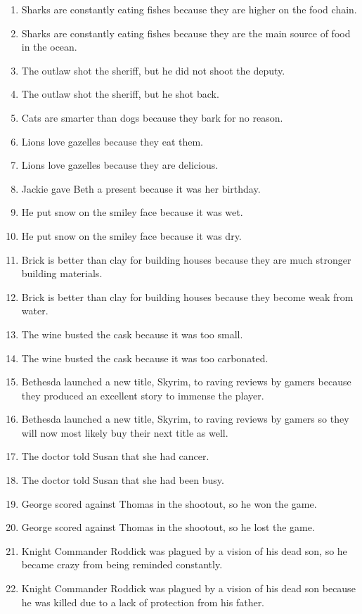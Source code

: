 \documentclass{article}
\begin{document}
\begin{enumerate}
	\item Sharks are constantly eating fishes because they are higher on the food chain.
	\item Sharks are constantly eating fishes because they are the main source of food in the ocean.
	\item The outlaw shot the sheriff, but he did not shoot the deputy.
	\item The outlaw shot the sheriff, but he shot back.
	\item Cats are smarter than dogs because they bark for no reason.
	\item Lions love gazelles because they eat them.
	\item Lions love gazelles because they are delicious.
	\item Jackie gave Beth a present because it was her birthday.
	\item He put snow on the smiley face because it was wet.
	\item He put snow on the smiley face because it was dry.
	\item Brick is better than clay for building houses because they are much stronger building materials.
	\item Brick is better than clay for building houses because they become weak from water.
	\item The wine busted the cask because it was too small.
	\item The wine busted the cask because it was too carbonated.
	\item Bethesda launched a new title, Skyrim, to raving reviews by gamers because they produced an excellent story to immense the player.
	\item Bethesda launched a new title, Skyrim, to raving reviews by gamers so they will now most likely buy their next title as well.
	\item The doctor told Susan that she had cancer.
	\item The doctor told Susan that she had been busy.
	\item George scored against Thomas in the shootout, so he won the game.
	\item George scored against Thomas in the shootout, so he lost the game.
	\item Knight Commander Roddick was plagued by a vision of his dead son, so he became crazy from being reminded constantly.
	\item Knight Commander Roddick was plagued by a vision of his dead son because he was killed due to a lack of protection from his father.

\end{enumerate}
\end{document}
